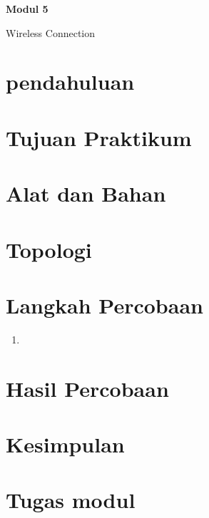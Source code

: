 \newpage
\setcounter{section}{0}
\renewcommand{\thesection}{\arabic{section}}

\begin{center}
    \Huge
    \textbf{Modul 5}
    
    Wireless Connection

\end{center}


\section{pendahuluan}


\section{Tujuan Praktikum}


\section{Alat dan Bahan}


\section{Topologi}


\section{Langkah Percobaan}
\begin{enumerate}
    \item 
\end{enumerate}

\section{Hasil Percobaan}


\section{Kesimpulan}


\section{Tugas modul}
